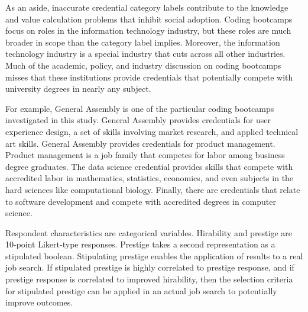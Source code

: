 As an aside, inaccurate credential category labels contribute to the knowledge and value calculation problems that inhibit social adoption.
Coding bootcamps focus on roles in the information technology industry, but these roles are much broader in scope than the category label implies.
Moreover, the information technology industry is a special industry that cuts across all other industries.
Much of the academic, policy, and industry discussion on coding bootcamps misses that these institutions provide credentials that potentially compete with university degrees in nearly any subject.

For example, General Assembly is one of the particular coding bootcamps investigated in this study.
General Assembly provides credentials for user experience design, a set of skills involving market research, and applied technical art skills.
General Assembly provides credentials for product management.
Product management is a job family that competes for labor among business degree graduates.
The data science credential provides skills that compete with accredited labor in mathematics, statistics, economics, and even subjects in the hard sciences like computational biology.
Finally, there are credentials that relate to software development and compete with accredited degrees in computer science.


Respondent characteristics are categorical variables.
Hirability and prestige are 10-point Likert-type responses.
Prestige takes a second representation as a stipulated boolean.
Stipulating prestige enables the application of results to a real job search.
If stipulated prestige is highly correlated to prestige response,
and if prestige response is correlated to improved hirability,
then the selection criteria for stipulated prestige can be applied in an actual job search to potentially improve outcomes.

